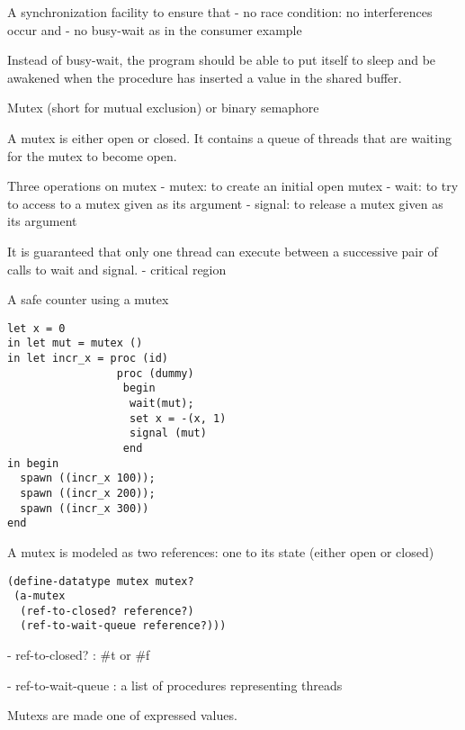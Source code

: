 \documentclass{article}
\begin{document}
\begin{huge}
A synchronization facility to ensure that \al
- no race condition: no interferences occur and \al
- no busy-wait as in the consumer example

Instead of busy-wait, the program should be able to put itself to sleep and be awakened when the procedure has inserted a value in the shared buffer.



Mutex (short for mutual exclusion) or binary semaphore

A mutex is either open or closed. It contains a queue of threads that are waiting for the mutex to become open. 

Three operations on mutex \al
- mutex: to create an initial open mutex \al
- wait: to try to access to a mutex given as its argument \al
- signal: to release a mutex given as its argument \al

It is guaranteed that only one thread can execute between a successive pair of calls to wait and signal. \al
- critical region


A safe counter using a mutex
\begin{lstlisting}
let x = 0
in let mut = mutex ()
in let incr_x = proc (id)
                 proc (dummy)
                  begin
                   wait(mut);
                   set x = -(x, 1)
                   signal (mut)
                  end
in begin
  spawn ((incr_x 100));
  spawn ((incr_x 200));
  spawn ((incr_x 300))
end             
\end{lstlisting}


A mutex is modeled as two references: one to its state (either open or closed)

\begin{lstlisting}
(define-datatype mutex mutex?
 (a-mutex
  (ref-to-closed? reference?)
  (ref-to-wait-queue reference?)))
\end{lstlisting}

- ref-to-closed? : \#t or \#f 

- ref-to-wait-queue : a list of procedures representing threads

Mutexs are made one of expressed values.


\end{huge}
\end{document}
